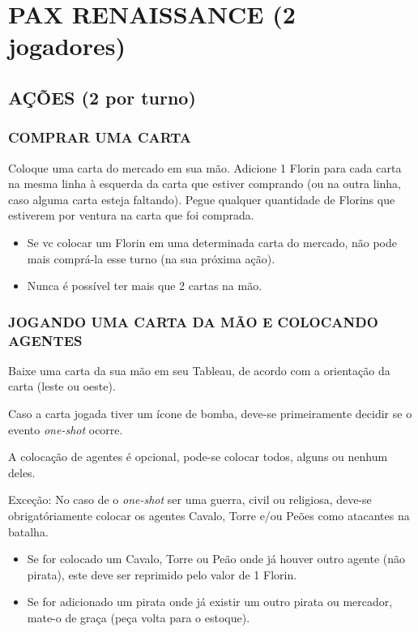 \documentclass[11pt]{article}
\author{Fabio Favero Henkes}
\date{\today}
\title{}
\begin{document}
\tableofcontents

\section{PAX RENAISSANCE (2 jogadores)}
\label{sec:org24e78f4}

\subsection{AÇÕES (2 por turno)}
\label{sec:orgc6ae9c8}

\subsubsection{COMPRAR UMA CARTA}
\label{sec:org35edcfd}

Coloque uma carta do mercado em sua mão. Adicione 1 Florin para cada carta na mesma linha à esquerda da carta que estiver comprando (ou na outra linha, caso alguma carta esteja faltando).
Pegue qualquer quantidade de Florins que estiverem por ventura na carta que foi comprada.

\begin{itemize}
\item Se vc colocar um Florin em uma determinada carta do mercado, não pode mais comprá-la esse turno (na sua próxima ação).

\item Nunca é possível ter mais que 2 cartas na mão.
\end{itemize}

\subsubsection{JOGANDO UMA CARTA DA MÃO E COLOCANDO AGENTES}
\label{sec:orgd4f3d71}

Baixe uma carta da sua mão em seu Tableau, de acordo com a orientação da carta (leste ou oeste).

Caso a carta jogada tiver um ícone de bomba, deve-se primeiramente decidir se o evento \emph{one-shot} ocorre.

A colocação de agentes é opcional, pode-se colocar todos, alguns ou nenhum deles.

Exceção: No caso de o \emph{one-shot} ser uma guerra, civil ou religiosa, deve-se obrigatóriamente colocar os agentes Cavalo, Torre e/ou Peões como atacantes na batalha.

\begin{itemize}
\item Se for colocado um Cavalo, Torre ou Peão onde já houver outro agente (não pirata), este deve ser reprimido pelo valor de 1 Florin.

\item Se for adicionado um pirata onde já existir um outro pirata ou mercador, mate-o de graça (peça volta para o estoque).
\end{itemize}
\end{document}
